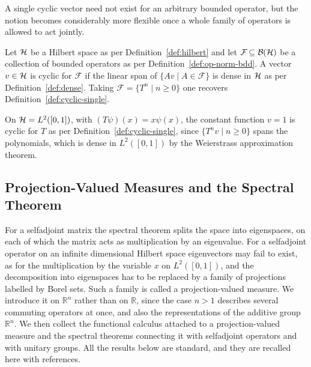 \noindent A single cyclic vector need not exist for an arbitrary bounded operator, but the notion becomes considerably more flexible once a whole family of operators is allowed to act jointly. 

\begin{definition}\label{def:cyclic-family}
	Let $\H$ be a Hilbert space as per Definition~\ref{def:hilbert} and let $\mathcal{F}\subseteq\mathcal{B}(\H)$ be a collection of bounded operators as per Definition~\ref{def:op-norm-bdd}. A vector $v\in\H$ is cyclic for $\mathcal{F}$ if the linear span of $\{Av\mid A\in\mathcal{F}\}$ is dense in $\H$ as per Definition~\ref{def:dense}. Taking $\mathcal{F}=\{T^n\mid n\geq 0\}$ one recovers Definition~\ref{def:cyclic-single}.
\end{definition}

\begin{example}\label{ex:cyclic-multiplication}
	On $\H=L^2([0,1])$, with $(T\psi)(x)=x\psi(x)$, the constant function $v=1$ is cyclic for $T$ as per Definition~\ref{def:cyclic-single}, since $\{T^nv\mid n\geq0\}$ spans the polynomials, which is dense in $L^2([0,1])$ by the Weierstrass approximation theorem.
\end{example}

\subsection*{Projection-Valued Measures and the Spectral Theorem}

For a selfadjoint matrix the spectral theorem splits the space into eigenspaces, on each of which the matrix acts as multiplication by an eigenvalue. For a selfadjoint operator on an infinite dimensional Hilbert space eigenvectors may fail to exist, as for the multiplication by the variable $x$ on $L^2([0,1])$, and the decomposition into eigenspaces has to be replaced by a family of projections labelled by Borel sets. Such a family is called a projection-valued measure. We introduce it on $\mathbb{R}^n$ rather than on $\mathbb{R}$, since the case $n>1$ describes several commuting operators at once, and also the representations of the additive group $\mathbb{R}^n$. We then collect the functional calculus attached to a projection-valued measure and the spectral theorems connecting it with selfadjoint operators and with unitary groups. All the results below are standard, and they are recalled here with references.

